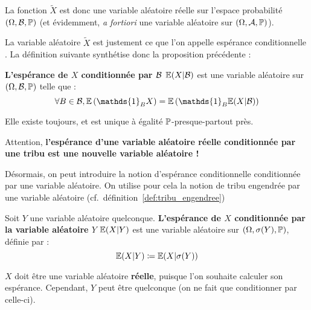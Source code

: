 \documentclass[../integ-proba.tex]{subfiles}
\begin{document}
    \begin{rem}
        La fonction $\tilde{X}$ est donc une variable aléatoire réelle sur l'espace probabilité $\left( \Omega, \mathcal{B}, \mathbb{P} \right)$ (et évidemment, \textit{a fortiori} une variable aléatoire sur $\left( \Omega, \mathcal{A}, \mathbb{P} \right)$).
    \end{rem}

    La variable aléatoire $\tilde{X}$ est justement ce que l'on appelle \og espérance conditionnelle \fg.
    La définition suivante synthétise donc la proposition précédente :

    \begin{defi}
        \textbf{L'espérance de $X$ conditionnée par $\mathcal{B}$ $\mathbb{E}(X | \mathcal{B})$} est une variable aléatoire sur $\left( \Omega, \mathcal{B}, \mathbb{P} \right)$ telle que :
        \begin{displaymath}
            \forall B \in \B, \esp\left( \mathds{1}_B X \right) = \esp\left( \mathds{1}_B \esp(X | \B) \right)
        \end{displaymath}

        Elle existe toujours, et est unique à égalité $\mathbb{P}$-presque-partout près.
    \end{defi}

    \begin{rem}
        Attention, \textbf{l'espérance d'une variable aléatoire réelle conditionnée par une tribu est une nouvelle variable aléatoire !}
    \end{rem}

    Désormais, on peut introduire la notion d'espérance conditionnelle conditionnée par une variable aléatoire.
    On utilise pour cela la notion de tribu engendrée par une variable aléatoire (cf.\ définition~\ref{def:tribu_engendree})

    \begin{defi}
        Soit $Y$ une variable aléatoire quelconque.
        \textbf{L'espérance de $X$ conditionnée par la variable aléatoire $Y$ $\mathbb{E}(X | Y)$} est une variable aléatoire sur $\left( \Omega, \sigma(Y), \mathbb{P} \right)$, définie par :
        \begin{displaymath}
            \mathbb{E}(X | Y) \coloneqq \mathbb{E}(X | \sigma(Y))
        \end{displaymath}
    \end{defi}

    \begin{rem}
        $X$ doit être une variable aléatoire \textbf{réelle}, puisque l'on souhaite calculer son espérance.
        Cependant, $Y$ peut être quelconque (on ne fait que conditionner par celle-ci).
    \end{rem}
\end{document}
